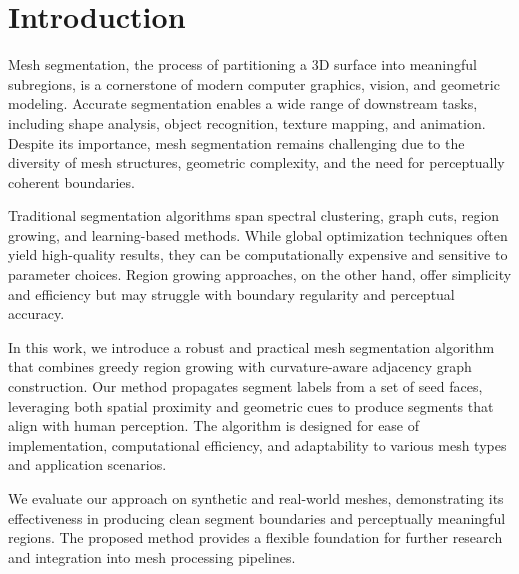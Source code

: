 \section{Introduction}
Mesh segmentation, the process of partitioning a 3D surface into meaningful subregions, is a cornerstone of modern computer graphics, vision, and geometric modeling. Accurate segmentation enables a wide range of downstream tasks, including shape analysis, object recognition, texture mapping, and animation. Despite its importance, mesh segmentation remains challenging due to the diversity of mesh structures, geometric complexity, and the need for perceptually coherent boundaries.

Traditional segmentation algorithms span spectral clustering, graph cuts, region growing, and learning-based methods. While global optimization techniques often yield high-quality results, they can be computationally expensive and sensitive to parameter choices. Region growing approaches, on the other hand, offer simplicity and efficiency but may struggle with boundary regularity and perceptual accuracy.

In this work, we introduce a robust and practical mesh segmentation algorithm that combines greedy region growing with curvature-aware adjacency graph construction. Our method propagates segment labels from a set of seed faces, leveraging both spatial proximity and geometric cues to produce segments that align with human perception. The algorithm is designed for ease of implementation, computational efficiency, and adaptability to various mesh types and application scenarios.

We evaluate our approach on synthetic and real-world meshes, demonstrating its effectiveness in producing clean segment boundaries and perceptually meaningful regions. The proposed method provides a flexible foundation for further research and integration into mesh processing pipelines.

